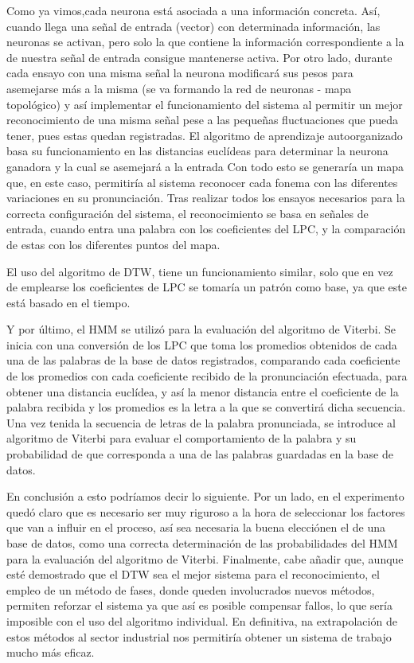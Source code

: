 \documentclass{article}
\begin{document}
Como ya vimos,cada neurona está asociada a una información concreta. Así, cuando llega una señal de entrada (vector) con determinada información, las neuronas se activan, pero solo la que contiene la información correspondiente a la de nuestra señal de entrada consigue mantenerse activa. Por otro lado, durante cada ensayo con una misma señal la neurona modificará sus pesos para asemejarse más a la misma (se va formando la red de neuronas - mapa topológico) y así implementar el funcionamiento del sistema al permitir un mejor reconocimiento de una misma señal pese a las pequeñas fluctuaciones que pueda tener, pues estas quedan registradas. 
El algoritmo de aprendizaje autoorganizado basa su funcionamiento en las distancias euclídeas para determinar la neurona ganadora y la cual se asemejará a la entrada
Con todo esto se generaría un mapa que, en este caso, permitiría al sistema reconocer cada fonema con las diferentes variaciones en su pronunciación. 
Tras realizar todos los ensayos necesarios para la correcta configuración del sistema, el reconocimiento se basa en señales de entrada, cuando entra una palabra con los coeficientes del LPC, y la comparación de estas con los diferentes puntos del mapa. 

El uso del algoritmo de DTW, tiene un funcionamiento similar, solo que en vez de emplearse los coeficientes de LPC se tomaría un patrón como base, ya que este está basado en el tiempo. 

Y por último, el HMM  se utilizó para la evaluación del algoritmo de Viterbi. Se inicia con una conversión de los LPC que toma los promedios obtenidos de cada una de las palabras de la base de datos registrados, comparando cada coeficiente de los promedios con cada coeficiente recibido de la pronunciación efectuada, para obtener una distancia euclídea, y así la menor distancia entre el coeficiente de la palabra recibida y los promedios es la letra a la que se convertirá dicha secuencia. Una vez tenida la secuencia de letras de la palabra pronunciada, se introduce al algoritmo de Viterbi para evaluar el comportamiento de la palabra y su probabilidad de que corresponda a una de las palabras guardadas en la base de datos.


En conclusión a esto podríamos decir lo siguiente. 
Por un lado, en el experimento quedó claro que es necesario ser muy riguroso a la hora de seleccionar los factores que van a influir en el proceso, así sea necesaria la buena elecciónen el de una base de datos, como una correcta determinación de las probabilidades del HMM para la evaluación del algoritmo de Viterbi.
Finalmente, cabe añadir que, aunque esté demostrado que el DTW sea el mejor sistema para el reconocimiento, el empleo de un método de fases, donde queden involucrados nuevos métodos, permiten reforzar el sistema ya que así es posible compensar fallos, lo que sería imposible con el uso del algoritmo individual. 
En definitiva, na extrapolación de estos métodos al sector industrial nos permitiría obtener un sistema de trabajo mucho más eficaz.
\end{document}

